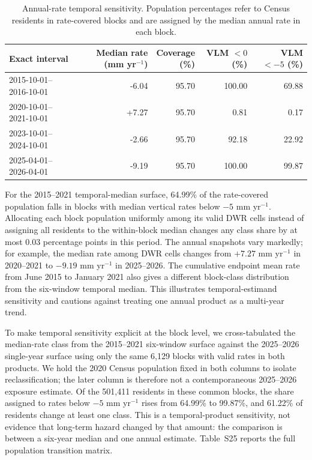 \documentclass[10pt,a4paper]{article}
\begin{document}
\begin{table}[htbp]\centering\small
\caption{Annual-rate temporal sensitivity. Population percentages refer to Census residents in rate-covered blocks and are assigned by the median annual rate in each block.}
\begin{tabular}{lrrrr}\toprule
Exact interval & \shortstack{Median rate\\(mm yr$^{-1}$)} & \shortstack{Coverage\\(\%)} & \shortstack{VLM $<0$\\(\%)} & \shortstack{VLM $<-5$\\(\%)} \\\midrule
2015-10-01--2016-10-01 & -6.04 & 95.70 & 100.00 & 69.88 \\
2020-10-01--2021-10-01 & +7.27 & 95.70 & 0.81 & 0.17 \\
2023-10-01--2024-10-01 & -2.66 & 95.70 & 92.18 & 22.92 \\
2025-04-01--2026-04-01 & -9.19 & 95.70 & 100.00 & 99.87 \\
\bottomrule\end{tabular}
\end{table}

For the 2015--2021 temporal-median surface, 64.99\% of the rate-covered population falls in blocks with median vertical rates below $-5$ mm yr$^{-1}$. Allocating each block population uniformly among its valid DWR cells instead of assigning all residents to the within-block median changes any class share by at most 0.03 percentage points in this period. The annual snapshots vary markedly; for example, the median rate among DWR cells changes from $+7.27$ mm yr$^{-1}$ in 2020--2021 to $-9.19$ mm yr$^{-1}$ in 2025--2026. The cumulative endpoint mean rate from June 2015 to January 2021 also gives a different block-class distribution from the six-window temporal median. This illustrates temporal-estimand sensitivity and cautions against treating one annual product as a multi-year trend.

To make temporal sensitivity explicit at the block level, we cross-tabulated the median-rate class from the 2015--2021 six-window surface against the 2025--2026 single-year surface using only the same 6,129 blocks with valid rates in both products. We hold the 2020 Census population fixed in both columns to isolate reclassification; the later column is therefore not a contemporaneous 2025--2026 exposure estimate. Of the 501,411 residents in these common blocks, the share assigned to rates below $-5$ mm yr$^{-1}$ rises from 64.99\% to 99.87\%, and 61.22\% of residents change at least one class. This is a temporal-product sensitivity, not evidence that long-term hazard changed by that amount: the comparison is between a six-year median and one annual estimate. Table~S25 reports the full population transition matrix.
\end{document}

